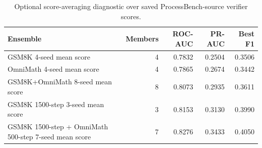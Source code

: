 \begin{table}[t]
\centering
\small
\begin{tabular}{lrrrr}
\toprule
Ensemble & Members & ROC-AUC & PR-AUC & Best F1 \\
\midrule
GSM8K 4-seed mean score & 4 & 0.7832 & 0.2504 & 0.3506 \\
OmniMath 4-seed mean score & 4 & 0.7865 & 0.2674 & 0.3442 \\
GSM8K+OmniMath 8-seed mean score & 8 & 0.8073 & 0.2935 & 0.3611 \\
GSM8K 1500-step 3-seed mean score & 3 & 0.8153 & 0.3130 & 0.3990 \\
GSM8K 1500-step + OmniMath 500-step 7-seed mean score & 7 & 0.8276 & 0.3433 & 0.4050 \\
\bottomrule
\end{tabular}
\caption{Optional score-averaging diagnostic over saved ProcessBench-source verifier scores.}
\label{tab:phase-b-score-ensembles}
\end{table}
